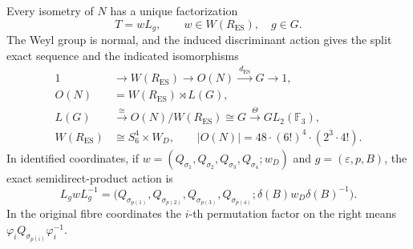 \begin{theorem}
\label{esn:fa:thm:full-quotient}
Every isometry of \(N\) has a unique factorization
\[
 T=wL_g,\qquad w\in W(R_{\mathrm{ES}}),\quad g\in G.
\]
The Weyl group is normal, and the induced discriminant action gives
the split exact sequence and the indicated isomorphisms
\begin{equation}
 \begin{split}
 1&\longrightarrow W(R_{\mathrm{ES}})
   \longrightarrow O(N)\xrightarrow{\ d_{\mathrm{ES}}\ }G
   \longrightarrow1,\\
 O(N)&=W(R_{\mathrm{ES}})\rtimes L(G),\\
 L(G)&\xrightarrow{\ \cong\ }O(N)/W(R_{\mathrm{ES}})
               \cong G\xrightarrow{\ \Theta\ }GL_2(\mathbb F_3),\\
 W(R_{\mathrm{ES}})&\cong S_6^4\times W_D,
 \qquad |O(N)|=48\cdot(6!)^4\cdot(2^3\cdot4!).
 \end{split}
 \label{esn:fa:eq:full-group}
\end{equation}
In identified coordinates, if
\(w=(Q_{\sigma_1},Q_{\sigma_2},Q_{\sigma_3},Q_{\sigma_4};w_D)\)
and \(g=(\varepsilon,p,B)\), the exact semidirect-product action is
\begin{equation}
 L_gwL_g^{-1}
   =\bigl(Q_{\sigma_{p(1)}},Q_{\sigma_{p(2)}},
          Q_{\sigma_{p(3)}},Q_{\sigma_{p(4)}};
          \delta(B)w_D\delta(B)^{-1}\bigr).
 \label{esn:fa:eq:weyl-conjugation}
\end{equation}
In the original fibre coordinates the \(i\)-th permutation factor
on the right means
\(\varphi_iQ_{\sigma_{p(i)}}\varphi_i^{-1}\).
\end{theorem}

